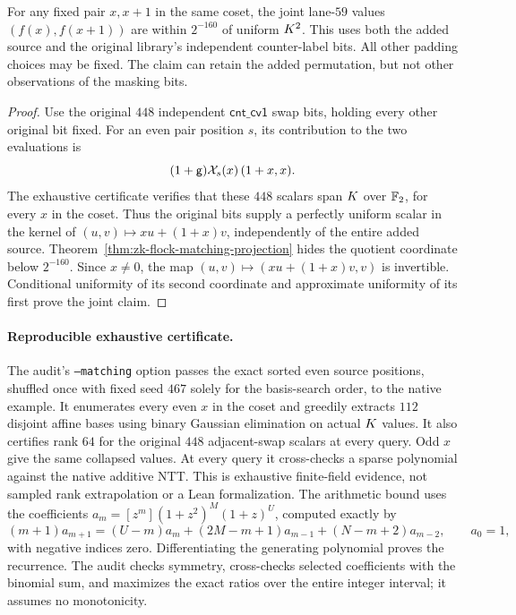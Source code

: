 \begin{corollary}\label{cor:zk-flock-matching-pair}
For any fixed pair $x,x+1$ in the same coset, the joint lane-$59$ values $(f(x),f(x+1))$ are within $2^{-160}$ of uniform $K^2$. This uses both the added source and the original library's independent counter-label bits. All other padding choices may be fixed. The claim can retain the added permutation, but not other observations of the masking bits.
\end{corollary}
\begin{proof}
Use the original $448$ independent $\mathsf{cnt\_cv1}$ swap bits, holding every other original bit fixed. For an even pair position $s$, its contribution to the two evaluations is
\[
 (1+\mathsf{g})\mathcal{X}_s(x)\,(1+x,x).
\]
The exhaustive certificate verifies that these $448$ scalars span $K$ over $\mathbb{F}_2$, for every $x$ in the coset. Thus the original bits supply a perfectly uniform scalar in the kernel of $(u,v)\mapsto xu+(1+x)v$, independently of the entire added source. Theorem~\ref{thm:zk-flock-matching-projection} hides the quotient coordinate below $2^{-160}$. Since $x\ne0$, the map $(u,v)\mapsto(xu+(1+x)v,v)$ is invertible. Conditional uniformity of its second coordinate and approximate uniformity of its first prove the joint claim.
\end{proof}

\paragraph{Reproducible exhaustive certificate.} The audit's \texttt{--matching} option passes the exact sorted even source positions, shuffled once with fixed seed $467$ solely for the basis-search order, to the native example. It enumerates every even $x$ in the coset and greedily extracts $112$ disjoint affine bases using binary Gaussian elimination on actual $K$ values. It also certifies rank $64$ for the original $448$ adjacent-swap scalars at every query. Odd $x$ give the same collapsed values. At every query it cross-checks a sparse polynomial against the native additive NTT. This is exhaustive finite-field evidence, not sampled rank extrapolation or a Lean formalization. The arithmetic bound uses the coefficients $a_m=[z^m](1+z^2)^M(1+z)^U$, computed exactly by
\[
 (m+1)a_{m+1}
 =(U-m)a_m+(2M-m+1)a_{m-1}+(N-m+2)a_{m-2},
 \qquad a_0=1,
\]
with negative indices zero. Differentiating the generating polynomial proves the recurrence. The audit checks symmetry, cross-checks selected coefficients with the binomial sum, and maximizes the exact ratios over the entire integer interval; it assumes no monotonicity.

